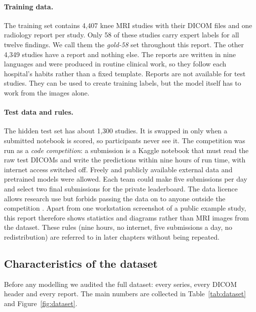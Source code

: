 \paragraph{Training data.} The training set contains 4,407 knee MRI studies with their DICOM files and one radiology report per study. Only 58 of these studies carry expert labels for all twelve findings. We call them the \emph{gold-58} set throughout this report. The other 4,349 studies have a report and nothing else. The reports are written in nine languages and were produced in routine clinical work, so they follow each hospital's habits rather than a fixed template. Reports are not available for test studies. They can be used to create training labels, but the model itself has to work from the images alone.

\paragraph{Test data and rules.} The hidden test set has about 1,300 studies. It is swapped in only when a submitted notebook is scored, so participants never see it. The competition was run as a \emph{code competition}: a submission is a Kaggle notebook that must read the raw test DICOMs and write the predictions within nine hours of run time, with internet access switched off. Freely and publicly available external data and pretrained models were allowed. Each team could make five submissions per day and select two final submissions for the private leaderboard. The data licence allows research use but forbids passing the data on to anyone outside the competition \cite{kaggle_rsna_knee}. Apart from one workstation screenshot of a public example study, this report therefore shows statistics and diagrams rather than MRI images from the dataset. These rules (nine hours, no internet, five submissions a day, no redistribution) are referred to in later chapters without being repeated.

\subsection{Characteristics of the dataset}

Before any modelling we audited the full dataset: every series, every DICOM header and every report. The main numbers are collected in Table~\ref{tab:dataset} and Figure~\ref{fig:dataset}.

